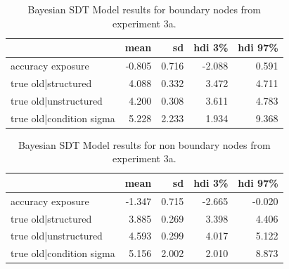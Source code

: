 \begin{table}[H]
    \centering
    \caption{Bayesian SDT Model results for boundary nodes from experiment 3a. }
    \label{tab:exp3-bayesmodel-boundary-sdt}
    \begin{tabular}{lrrrr}
        \toprule
         & mean & sd & hdi 3\% & hdi 97\% \\
        \midrule
        accuracy exposure & -0.805 & 0.716 & -2.088 & 0.591 \\
        true old|structured & 4.088 & 0.332 & 3.472 & 4.711 \\
        true old|unstructured & 4.200 & 0.308 & 3.611 & 4.783 \\
        true old|condition sigma & 5.228 & 2.233 & 1.934 & 9.368 \\
        \bottomrule
        \end{tabular}        
\end{table}

\begin{table}[H]
    \centering
    \caption{Bayesian SDT Model results for non boundary nodes from experiment 3a. }
    \label{tab:exp3-bayesmodel-nonboundary-sdt}
    \begin{tabular}{lrrrr}
        \toprule
         & mean & sd & hdi 3\% & hdi 97\% \\
        \midrule
        accuracy exposure & -1.347 & 0.715 & -2.665 & -0.020 \\
        true old|structured & 3.885 & 0.269 & 3.398 & 4.406 \\
        true old|unstructured & 4.593 & 0.299 & 4.017 & 5.122 \\
        true old|condition sigma & 5.156 & 2.002 & 2.010 & 8.873 \\
        \bottomrule
        \end{tabular}
        
\end{table}

